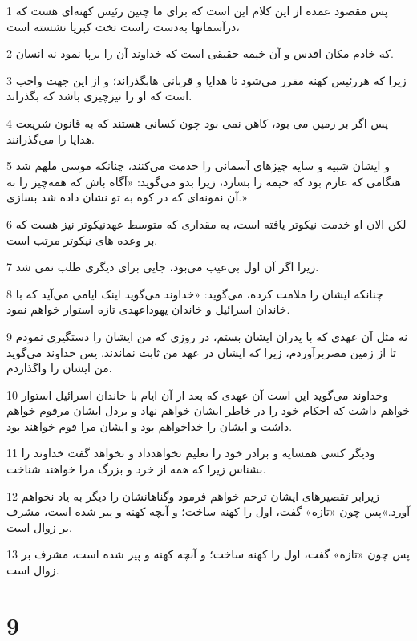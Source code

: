 \par 1 پس مقصود عمده از این کلام این است که برای ما چنین رئیس کهنه‌ای هست که درآسمانها به‌دست راست تخت کبریا نشسته است،
\par 2 که خادم مکان اقدس و آن خیمه حقیقی است که خداوند آن را برپا نمود نه انسان.
\par 3 زیرا که هررئیس کهنه مقرر می‌شود تا هدایا و قربانی هابگذراند؛ و از این جهت واجب است که او را نیزچیزی باشد که بگذراند.
\par 4 پس اگر بر زمین می بود، کاهن نمی بود چون کسانی هستند که به قانون شریعت هدایا را می‌گذرانند.
\par 5 و ایشان شبیه و سایه چیزهای آسمانی را خدمت می‌کنند، چنانکه موسی ملهم شد هنگامی که عازم بود که خیمه را بسازد، زیرا بدو می‌گوید: «آگاه باش که همه‌چیز را به آن نمونه‌ای که در کوه به تو نشان داده شد بسازی.»
\par 6 لکن الان او خدمت نیکوتر یافته است، به مقداری که متوسط عهدنیکوتر نیز هست که بر وعده های نیکوتر مرتب است.
\par 7 زیرا اگر آن اول بی‌عیب می‌بود، جایی برای دیگری طلب نمی شد.
\par 8 چنانکه ایشان را ملامت کرده، می‌گوید: «خداوند می‌گوید اینک ایامی می‌آید که با خاندان اسرائیل و خاندان یهوداعهدی تازه استوار خواهم نمود.
\par 9 نه مثل آن عهدی که با پدران ایشان بستم، در روزی که من ایشان را دستگیری نمودم تا از زمین مصربرآوردم، زیرا که ایشان در عهد من ثابت نماندند. پس خداوند می‌گوید من ایشان را واگذاردم.
\par 10 وخداوند می‌گوید این است آن عهدی که بعد از آن ایام با خاندان اسرائیل استوار خواهم داشت که احکام خود را در خاطر ایشان خواهم نهاد و بردل ایشان مرقوم خواهم داشت و ایشان را خداخواهم بود و ایشان مرا قوم خواهند بود.
\par 11 ودیگر کسی همسایه و برادر خود را تعلیم نخواهدداد و نخواهد گفت خداوند را بشناس زیرا که همه از خرد و بزرگ مرا خواهند شناخت.
\par 12 زیرابر تقصیرهای ایشان ترحم خواهم فرمود وگناهانشان را دیگر به یاد نخواهم آورد.»پس چون «تازه» گفت، اول را کهنه ساخت؛ و آنچه کهنه و پیر شده است، مشرف بر زوال است.
\par 13 پس چون «تازه» گفت، اول را کهنه ساخت؛ و آنچه کهنه و پیر شده است، مشرف بر زوال است.

\chapter{9}

